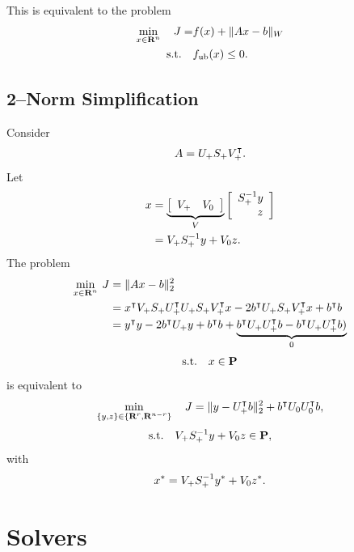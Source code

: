 \documentclass{article}
\begin{document}
    This is equivalent to the problem
    \begin{align*}
        \min_{x\in\textbf{R}^n}\quad J = &f(x)+\|A x - b\|_W\\
        \text{s.t.}\quad &f_{\text{ub}}(x)\leq0.
    \end{align*}

\clearpage

\subsection{2--Norm Simplification}
    Consider
    \begin{align*}
        A = U_+S_+V_+^\intercal.
    \end{align*}
    Let
    \begin{align*}
        x&=\underbrace{\mat{V_+ & V_0}}_{V}\mat{\psv^{-1} y \\ 
        \phantom{\psv^{-1}}z}\\
        &=\rrs \psv^{-1} y + \rns z.
    \end{align*}
    The problem
    \begin{align*}
        \min_{x\in\textbf{R}^n}\:J
        &= \| A x - b \|_2^2 \\
        &= x^\intercal V_+ S_+ U_+^\intercal U_+ S_+ V_+^\intercal x
            -2b^\intercal U_+ S_+ V_+^\intercal x +b^\intercal b\\
        &= y^\intercal y
            -2b^\intercal U_+ y +b^\intercal b+\underbrace{b^\intercal U_+U_+^\intercal b-b^\intercal U_+U_+^\intercal b)}_{0}
    \end{align*}
    \begin{align*}
        \text{s.t.} \quad x \in\textbf{P}
    \end{align*}
    is equivalent to
    \begin{align*}
    \min_{\{y,z\}\in\{\textbf{R}^r,\textbf{R}^{n-r}\}}\quad J=\|y - U_+^\intercal b\|_2^2 + b^\intercal U_0U_0^\intercal b,
    \end{align*}
    \begin{align*}
        \text{s.t.} \quad V_+ S_+^{-1} y + V_0 z \in\textbf{P},
    \end{align*}
    with 
    \begin{align*}
        x^* = V_+ S_+^{-1} y^* + V_0 z^*.
    \end{align*}

\clearpage

\section{Solvers}
\end{document}
